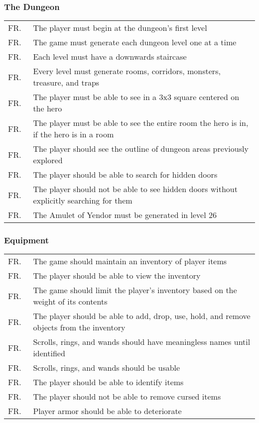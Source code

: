 \documentclass[12pt, titlepage]{article}
\newcounter{FRCounter}
\newcommand{\freq}[1]{
	\hfill\stepcounter{FRCounter}FR.\textbf{\theFRCounter}
	& #1
}
\begin{document}
		\subsubsection{The Dungeon}
			\begin{tabular}{p{0.1\linewidth}p{0.9\linewidth}}
				\freq{The player must begin at the dungeon's first level}\\
				\freq{The game must generate each dungeon level one at a time}\\
				\freq{Each level must have a downwards staircase}\\
				\freq{Every level must generate rooms, corridors, monsters, treasure, and traps}\\
				\freq{The player must be able to see in a 3x3 square centered on the hero}\\
				\freq{The player must be able to see the entire room the hero is in, if the hero is in a room}\\
				\freq{The player should see the outline of dungeon areas previously explored}\\
				\freq{The player should be able to search for hidden doors}\\
				\freq{The player should not be able to see hidden doors without explicitly searching for them}\\
				\freq{The Amulet of Yendor must be generated in level 26}\\
			\end{tabular}

		\subsubsection{Equipment}
			\begin{tabular}{p{0.1\linewidth}p{0.9\linewidth}}
				\freq{The game should maintain an inventory of player items}\\
				\freq{The player should be able to view the inventory}\\
				\freq{The game should limit the player's inventory based on the weight of its contents}\\
				\freq{The player should be able to add, drop, use, hold, and remove objects from the inventory}\\
				\freq{Scrolls, rings, and wands should have meaningless names until identified}\\
				\freq{Scrolls, rings, and wands should be usable}\\
				\freq{The player should be able to identify items}\\
				\freq{The player should not be able to remove cursed items}\\
				\freq{Player armor should be able to deteriorate}\\
			\end{tabular}
\end{document}
